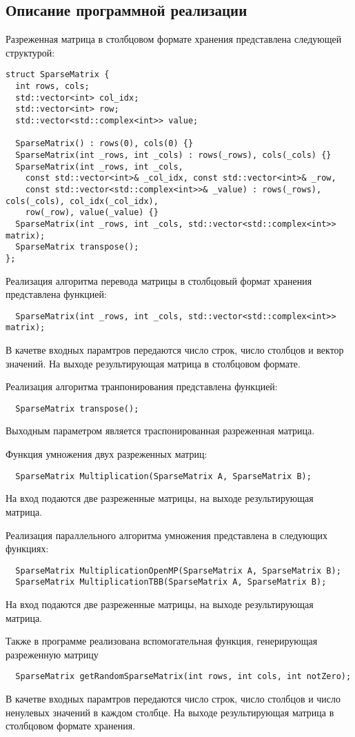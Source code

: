 \documentclass{report}
\begin{document}
\begin{center}
\section*{Описание программной реализации}
\end{center}
\par Разреженная матрица в столбцовом формате хранения представлена следующей структурой:
\begin{lstlisting}
struct SparseMatrix {
  int rows, cols;
  std::vector<int> col_idx;
  std::vector<int> row;
  std::vector<std::complex<int>> value;

  SparseMatrix() : rows(0), cols(0) {}
  SparseMatrix(int _rows, int _cols) : rows(_rows), cols(_cols) {}
  SparseMatrix(int _rows, int _cols,
    const std::vector<int>& _col_idx, const std::vector<int>& _row,
    const std::vector<std::complex<int>>& _value) : rows(_rows), cols(_cols), col_idx(_col_idx),
    row(_row), value(_value) {}
  SparseMatrix(int _rows, int _cols, std::vector<std::complex<int>> matrix);
  SparseMatrix transpose();
};
\end{lstlisting}
\par Реализация алгоритма перевода матрицы в столбцовый формат хранения представлена функцией:
\begin{lstlisting}
  SparseMatrix(int _rows, int _cols, std::vector<std::complex<int>> matrix);
\end{lstlisting}
В качетве входных парамтров передаются число строк, число столбцов и вектор значений. На выходе результирующая матрица в столбцовом формате.
\par Реализация алгоритма транпонирования представлена функцией:
\begin{lstlisting}
  SparseMatrix transpose();
\end{lstlisting}
Выходным параметром является траспонированная разреженная матрица.
\par Функция умножения двух разреженных матриц:
\begin{lstlisting}
  SparseMatrix Multiplication(SparseMatrix A, SparseMatrix B);
\end{lstlisting}
На вход подаются две разреженные матрицы, на выходе результирующая матрица.
\par Реализация параллельного алгоритма умножения представлена в следующих функциях:
\begin{lstlisting}
  SparseMatrix MultiplicationOpenMP(SparseMatrix A, SparseMatrix B);
  SparseMatrix MultiplicationTBB(SparseMatrix A, SparseMatrix B);
\end{lstlisting}
На вход подаются две разреженные матрицы, на выходе результирующая матрица.
\par Также в программе реализована вспомогательная функция, генерирующая разреженную матрицу
\begin{lstlisting}
  SparseMatrix getRandomSparseMatrix(int rows, int cols, int notZero);
\end{lstlisting}
В качетве входных парамтров передаются число строк, число столбцов и число ненулевых значений в каждом столбце. На выходе результирующая матрица в столбцовом формате хранения.
\newpage
\end{document}
